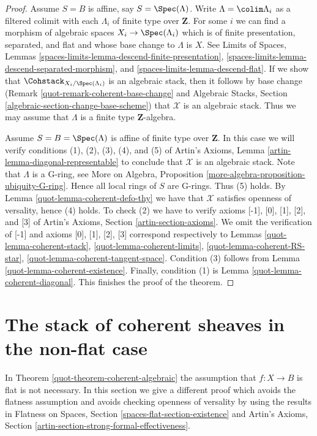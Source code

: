 \begin{proof}
\medskip\noindent
Assume $S = B$ is affine, say $S = \Spec(\Lambda)$.
Write $\Lambda = \colim \Lambda_i$ as a filtered colimit with each $\Lambda_i$
of finite type over $\mathbf{Z}$. For some $i$ we can find
a morphism of algebraic spaces $X_i \to \Spec(\Lambda_i)$
which is of finite presentation, separated, and flat and whose base change
to $\Lambda$ is $X$. See
Limits of Spaces, Lemmas
\ref{spaces-limits-lemma-descend-finite-presentation},
\ref{spaces-limits-lemma-descend-separated-morphism}, and
\ref{spaces-limits-lemma-descend-flat}.
If we show that $\Cohstack_{X_i/\Spec(\Lambda_i)}$ is an
algebraic stack, then it follows by base change
(Remark \ref{quot-remark-coherent-base-change} and
Algebraic Stacks, Section \ref{algebraic-section-change-base-scheme})
that $\mathcal{X}$ is an algebraic stack.
Thus we may assume that $\Lambda$ is a finite type $\mathbf{Z}$-algebra.

\medskip\noindent
Assume $S = B = \Spec(\Lambda)$ is affine of finite type over $\mathbf{Z}$.
In this case we will verify conditions (1), (2), (3), (4), and (5) of
Artin's Axioms, Lemma \ref{artin-lemma-diagonal-representable}
to conclude that $\mathcal{X}$ is an algebraic stack.
Note that $\Lambda$ is a G-ring, see
More on Algebra, Proposition \ref{more-algebra-proposition-ubiquity-G-ring}.
Hence all local rings of $S$ are G-rings. Thus (5) holds.
By Lemma \ref{quot-lemma-coherent-defo-thy}
we have that $\mathcal{X}$ satisfies openness of versality, hence (4) holds.
To check (2) we have to verify axioms [-1], [0], [1], [2], and [3]
of Artin's Axioms, Section \ref{artin-section-axioms}.
We omit the verification of [-1] and axioms
[0], [1], [2], [3] correspond respectively to
Lemmas \ref{quot-lemma-coherent-stack},
\ref{quot-lemma-coherent-limits},
\ref{quot-lemma-coherent-RS-star},
\ref{quot-lemma-coherent-tangent-space}.
Condition (3) follows from Lemma \ref{quot-lemma-coherent-existence}.
Finally, condition (1) is Lemma \ref{quot-lemma-coherent-diagonal}.
This finishes the proof of the theorem.
\end{proof}

\section{The stack of coherent sheaves in the non-flat case}
\label{quot-section-not-flat}
In Theorem \ref{quot-theorem-coherent-algebraic} the assumption that $f : X \to B$
is flat is not necessary. In this section we give a different proof
which avoids the flatness assumption and avoids checking openness
of versality by using the results
in Flatness on Spaces, Section \ref{spaces-flat-section-existence} and
Artin's Axioms, Section \ref{artin-section-strong-formal-effectiveness}.

